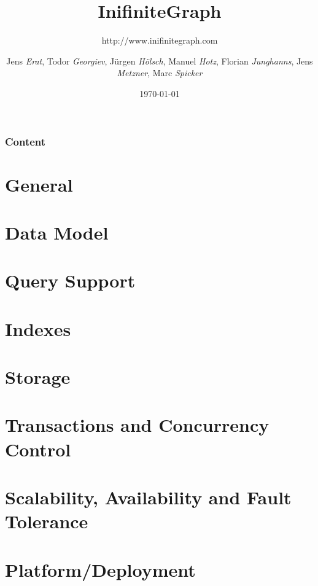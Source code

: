 \documentclass{beamer}
\title[InifiniteGraph]{\textsf{InifiniteGraph}}
\subtitle{http://www.inifinitegraph.com}
\author[JE,TG,JH,MH,FJ,JM,MS]{Jens \textit{Erat},
Todor \textit{Georgiev},
J\"{u}rgen \textit{H\"{o}lsch},
Manuel \textit{Hotz},
Florian \textit{Junghanns},
Jens \textit{Metzner},
Marc \textit{Spicker}}
\institute[]{Universität Konstanz}
\date{\today}
\begin{document}

\begin{frame}
\titlepage
\end{frame} 


\begin{frame}
\frametitle{Content}
\tableofcontents
\end{frame} 


\section{General}


\section{Data Model}


\section{Query Support}


\section{Indexes}


\section{Storage}


\section{Transactions and Concurrency Control}


\section{Scalability, Availability and Fault Tolerance}


\section{Platform/Deployment}

\end{document}
